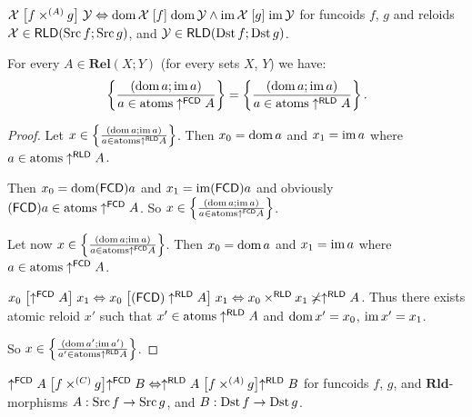 \begin{cor}
$\mathcal{X}\mathrel{\left[f\times^{(A)}g\right]}\mathcal{Y}\Leftrightarrow\operatorname{dom}\mathcal{X}\mathrel{\left[f\right]}\operatorname{dom}\mathcal{Y}\wedge\operatorname{im}\mathcal{X}\mathrel{\left[g\right]}\operatorname{im}\mathcal{Y}$
for funcoids $f$, $g$ and reloids $\mathcal{X}\in\mathsf{RLD}(\operatorname{Src} f;\operatorname{Src} g)$,
and $\mathcal{Y}\in\mathsf{RLD}(\operatorname{Dst} f;\operatorname{Dst} g)$.\end{cor}
\begin{lem}
For every $A\in\mathbf{Rel}(X;Y)$ (for every sets $X$, $Y$) we
have:
\[
\left\{ \frac{(\operatorname{dom} a;\operatorname{im} a)}{a\in\operatorname{atoms}\uparrow^{\mathsf{FCD}}A}\right\}=\left\{ \frac{(\operatorname{dom} a;\operatorname{im} a)}{a\in\operatorname{atoms}\uparrow^{\mathsf{RLD}}A}\right\}.
\]
\end{lem}
\begin{proof}
Let $x\in\left\{ \frac{(\operatorname{dom} a;\operatorname{im} a)}{a\in\operatorname{atoms}\uparrow^{\mathsf{RLD}}A}\right\}$.
Then $x_{0}=\operatorname{dom} a$ and $x_{1}=\operatorname{im} a$ where $a\in\operatorname{atoms}\uparrow^{\mathsf{RLD}}A$.

Then $x_{0}=\operatorname{dom}(\mathsf{FCD}) a$ and $x_{1}=\operatorname{im}(\mathsf{FCD}) a$ and obviously
$(\mathsf{FCD}) a\in\operatorname{atoms}\uparrow^{\mathsf{FCD}}A$. So $x\in\left\{ \frac{(\operatorname{dom} a;\operatorname{im} a)}{a\in\operatorname{atoms}\uparrow^{\mathsf{FCD}}A}\right\}$.

Let now $x\in\left\{ \frac{(\operatorname{dom} a;\operatorname{im} a)}{a\in\operatorname{atoms}\uparrow^{\mathsf{FCD}}A}\right\}$.
Then $x_{0}=\operatorname{dom} a$ and $x_{1}=\operatorname{im} a$ where $a\in\operatorname{atoms}\uparrow^{\mathsf{FCD}}A$.

$x_{0}\mathrel{\left[\uparrow^{\mathsf{FCD}}A\right]}x_{1}\Leftrightarrow x_{0}\mathrel{\left[(\mathsf{FCD})\uparrow^{\mathsf{RLD}}A\right]}x_{1}\Leftrightarrow x_{0}\times^{\mathsf{RLD}}x_{1}\not\asymp\uparrow^{\mathsf{RLD}}A$.
Thus there exists atomic reloid $x'$ such that $x'\in\operatorname{atoms}\uparrow^{\mathsf{RLD}}A$
and $\operatorname{dom} x'=x_{0}$, $\operatorname{im} x'=x_{1}$.

So $x\in\left\{ \frac{(\operatorname{dom} a';\operatorname{im} a')}{a'\in\operatorname{atoms}\uparrow^{\mathsf{RLD}}A}\right\}$.\end{proof}
\begin{thm}
\label{c-a-princ}$\uparrow^{\mathsf{FCD}}A\mathrel{\left[f\times^{(C)}g\right]}\uparrow^{\mathsf{FCD}}B\Leftrightarrow\uparrow^{\mathsf{RLD}}A\mathrel{\left[f\times^{(A)}g\right]}\uparrow^{\mathsf{RLD}}B$
for funcoids $f$, $g$, and $\mathbf{Rld}$-morphisms $A:\operatorname{Src} f\rightarrow\operatorname{Src} g$,
and $B:\operatorname{Dst} f\rightarrow\operatorname{Dst} g$.\end{thm}
